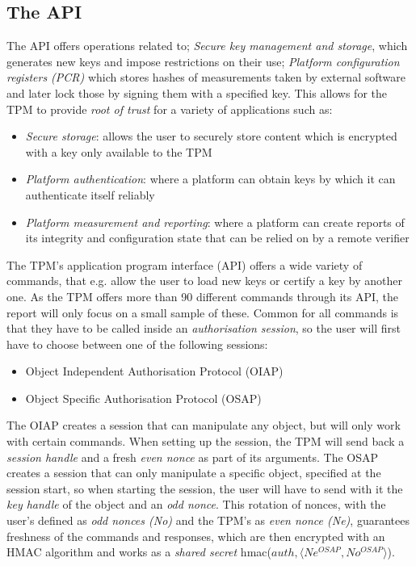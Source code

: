 \subsection{The API}
The API offers operations related to; \textit{Secure key management and storage}, which generates new keys and impose restrictions on their use; \textit{Platform configuration registers (PCR)} which stores hashes of measurements taken by external software and later lock those by signing them with a specified key. This allows for the TPM to provide \textit{root of trust} for a variety of applications such as:
\begin{itemize}
	\item \textit{Secure storage}: allows the user to securely store content which is encrypted with a key only available to the TPM
	\item \textit{Platform authentication}: where a platform can obtain keys by which it can authenticate itself reliably
	\item \textit{Platform measurement and reporting}: where a platform can create reports of its integrity and configuration state that can be relied on by a remote verifier
\end{itemize}
The TPM's application program interface (API) offers a wide variety of commands, that e.g. allow the user to load new keys or certify a key by another one. As the TPM offers more than 90 different commands through its API, the report will only focus on a small sample of these. Common for all commands is that they have to be called inside an \textit{authorisation session}, so the user will first have to choose between one of the following sessions:
\begin{itemize}
  \item Object Independent Authorisation Protocol (OIAP)
  \item Object Specific Authorisation Protocol (OSAP)
\end{itemize}
The OIAP creates a session that can manipulate any object, but will only work with certain commands. When setting up the session, the TPM will send back a \textit{session handle} and a fresh \textit{even nonce} as part of its arguments. 
The OSAP creates a session that can only manipulate a specific object, specified at the session start, so when starting the session, the user will have to send with it the \textit{key handle} of the object and an \textit{odd nonce}.
This rotation of nonces, with the user's defined as \textit{odd nonces (No)} and the TPM's as \textit{even nonce (Ne)}, guarantees freshness of the commands and responses, which are then encrypted with an HMAC algorithm and works as a \textit{shared secret} hmac($auth, \langle Ne^{OSAP}, No^{OSAP} \rangle $). 

